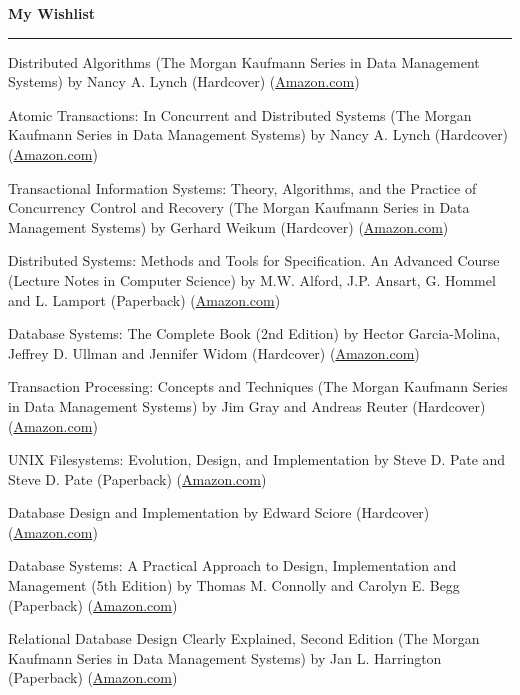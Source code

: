 \documentclass[10pt]{article}
\newcommand{\makeheading}[1]%
        {\hspace*{-\marginparsep minus \marginparwidth}%
         \begin{minipage}[t]{\textwidth+\marginparwidth+\marginparsep}%
                {\large \bfseries #1}\\[-0.15\baselineskip]%
                 \rule{\columnwidth}{1pt}%
         \end{minipage}}
\renewcommand{\section}[2]%
        {\pagebreak[2]\vspace{1.3\baselineskip}%
         \phantomsection\addcontentsline{toc}{section}{#1}%
         \hspace{0in}%
         \marginpar{
         \raggedright \scshape #1}#2}
\newenvironment{innerlist}[1][\enskip\textbullet]%
      {\begin{flushleft}\begin{compactitem}[#1]}{\end{compactitem}\end{flushleft}}
\newcommand{\bookitem}[5]{\item #1 \linebreak by #2 (#3) (\href{#4}{#5})}
\newcommand{\amazon}[4]{\bookitem{#1}{#2}{#3}{http://www.amazon.com/#4}{Amazon.com}}
\begin{document}
\makeheading {My Wishlist}

\section {Books}
	\begin{innerlist}
          \amazon{Distributed Algorithms
            (The Morgan Kaufmann Series in Data Management Systems)}
                 {Nancy A. Lynch}{Hardcover}
                 {Distributed-Algorithms-Kaufmann-Management-Systems/dp/1558603484}
          \amazon{Atomic Transactions: In Concurrent and Distributed Systems
            (The Morgan Kaufmann Series in Data Management Systems)}
                 {Nancy A. Lynch}{Hardcover}
                 {Atomic-Transactions-Concurrent-Distributed-Management/dp/155860104}
          \amazon{Transactional Information Systems:
            Theory, Algorithms, and the Practice of Concurrency Control and Recovery
            (The Morgan Kaufmann Series in Data Management Systems)}
                 {Gerhard Weikum}{Hardcover}
                 {Transactional-Information-Systems-Algorithms-Concurrency/dp/1558605088}
          \amazon{Distributed Systems: Methods and Tools for Specification.
            An Advanced Course (Lecture Notes in Computer Science)}
                 {M.W. Alford, J.P. Ansart, G. Hommel and L. Lamport}{Paperback}
                 {Distributed-Systems-Specification-Advanced-Computer/dp/3540152164}
          \amazon{Database Systems: The Complete Book (2nd Edition)}
                 {Hector Garcia-Molina, Jeffrey D. Ullman and Jennifer Widom}{Hardcover}
                 {Database-Systems-Complete-Book-2nd/dp/0131873253}
          \amazon{Transaction Processing: Concepts and Techniques
            (The Morgan Kaufmann Series in Data Management Systems)}
                 {Jim Gray and Andreas Reuter}{Hardcover}
                 {Transaction-Processing-Concepts-Techniques-Management/dp/1558601902}
          \amazon{UNIX Filesystems: Evolution, Design, and Implementation}
                 {Steve D. Pate and Steve D. Pate}{Paperback}
                 {UNIX-Filesystems-Evolution-Design-Implementation/dp/0471164836}
          \amazon{Database Design and Implementation}
                 {Edward Sciore}{Hardcover}
                 {Database-Design-Implementation-Edward-Sciore/dp/0471757160}
          \amazon{Database Systems:
            A Practical Approach to Design, Implementation and Management (5th Edition)}
                 {Thomas M. Connolly and Carolyn E. Begg}{Paperback}
                 {Database-Systems-Practical-Implementation-Management/dp/0321523067}
          \amazon{Relational Database Design Clearly Explained, Second Edition
            (The Morgan Kaufmann Series in Data Management Systems)}
                 {Jan L. Harrington}{Paperback}
                 {Relational-Database-Explained-Kaufmann-Management/dp/1558608206}


\end{innerlist}
\end{document}
